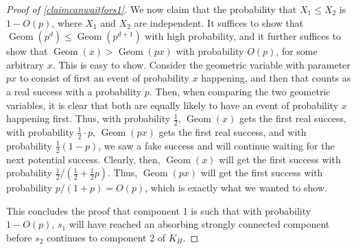 \documentclass[12pt]{article}
\theoremstyle{definition}
\theoremstyle{remark}
\begin{document}
\begin{proof}[Proof of \cref{claimcanwaitfors1}]
        We now claim that the probability that $X_1 \leq X_2$ is $1 - O(p)$, where $X_1$ and $X_2$ are independent. It suffices to show that $\operatorname{Geom}(p^d) \leq \operatorname{Geom}(p^{d+1})$ with high probability, and it further suffices to show that $\operatorname{Geom}(x) > \operatorname{Geom}(px)$ with probability $O(p)$, for some arbitrary $x$. This is easy to show. Consider the geometric variable with parameter $px$ to consist of first an event of probability $x$ happening, and then that counts as a real success with a probability $p$. Then, when comparing the two geometric variables, it is clear that both are equally likely to have an event of probability $x$ happening first. Thus, with probability $\frac{1}{2}$, $\operatorname{Geom}(x)$ gets the first real success, with probability $\frac{1}{2} \cdot p$, $\operatorname{Geom}(px)$ gets the first real success, and with probability $\frac{1}{2} (1 - p)$, we saw a fake success and will continue waiting for the next potential success. Clearly, then, $\operatorname{Geom}(x)$ will get the first success with probability $\frac{1}{2} / (\frac{1}{2} + \frac{1}{2}p)$. Thus, $\operatorname{Geom}(px)$ will get the first success with probability $p / (1 + p) = O(p)$, which is exactly what we wanted to show.

        This concludes the proof that component 1 is such that with probability $1 - O(p)$, $s_1$ will have reached an absorbing strongly connected component before $s_2$ continues to component 2 of $K_H$.
      \end{proof}
\end{document}
